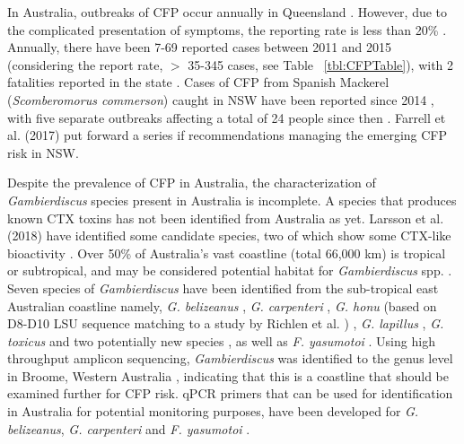 \documentclass[12pt]{article}
\begin{document}
In Australia, outbreaks of CFP occur annually in Queensland \citep{qldcig}. 
However, due to the complicated presentation of symptoms, the reporting rate is less than 20\% \citep{lewis2006ciguatera}. 
Annually, there have been 7-69 reported cases between 2011 and 2015 (considering the report rate, $>$ 35-345 cases, see Table ~\ref{tbl:CFPTable}), with 2 fatalities reported in the state \citep{tonge1967ciguatera}. 
Cases of CFP from Spanish Mackerel (\textit{Scomberomorus commerson}) caught in NSW have been reported since 2014 \cite{farrellclinical}, with five separate outbreaks affecting a total of 24 people since then \citep{farrell2017management}. 
Farrell et al. (2017) put forward a series if recommendations managing the emerging CFP risk in NSW.

Despite the prevalence of CFP in Australia, the characterization of \textit{Gambierdiscus} species present in Australia is incomplete. 
A species that produces known CTX toxins has not been identified from Australia as yet. 
Larsson et al. (2018) have identified some candidate species, two of which show some CTX-like bioactivity \cite{larsson2018toxicology}.
Over 50\% of Australia's vast coastline (total 66,000 km) is tropical or subtropical, and may be considered potential habitat for \emph{Gambierdiscus} spp. \citep{kretzschmar2017characterization}. 
Seven species of \emph{Gambierdiscus} have been identified from the sub-tropical east Australian coastline namely, \emph{G. belizeanus} \citep{murray2014molecular}, \emph{G. carpenteri} \citep{kohli2014high,sparrow2017effects}, \emph{G. honu} (based on D8-D10 LSU sequence matching to a study by Richlen et al. \cite{richlen2008phylogeography}) \citep{rhodes2017new}, \emph{G. lapillus} \citep{kretzschmar2017characterization,larsson2018toxicology}, \emph{G. toxicus} \citep{hallegraeff2010algae} and two potentially new species \cite{larsson2018toxicology}, as well as \emph{F. yasumotoi}  \citep{murray2014molecular}. 
Using high throughput amplicon sequencing, \textit{Gambierdiscus} was identified to the genus level in Broome, Western Australia \citep{kohli2014cob}, indicating that this is a coastline that should be examined further for CFP risk. 
qPCR primers that can be used for identification in Australia for potential monitoring purposes, have been developed for \emph{G. belizeanus}, \emph{G. carpenteri} and \emph{F. yasumotoi} \citep{nishimura2016quantitative,vandersea2012development}. 
 
\end{document}
